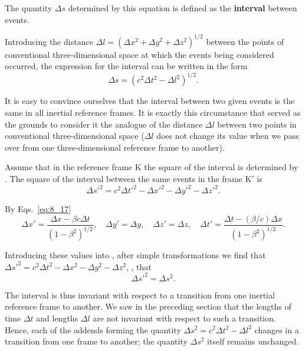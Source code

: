 \noindent
The quantity $\Delta s$ determined by this equation is defined as the \textbf{interval} between events.

Introducing the distance $\Delta l=\left(\Delta x^2+\Delta y^2+\Delta z^2\right)^{1/2}$ between the points of conventional three-dimensional space at which the events being considered occurred, the expression for the interval can be written in the form
\begin{equation}\label{eq:8_23}
	\Delta s = \left(c^2\Delta t^2 - \Delta l^2\right)^{1/2}.
\end{equation}

It is easy to convince ourselves that the interval between two given events is the same in all inertial reference frames. It is exactly this circumstance that served as the grounds to consider it the analogue of the distance $\Delta l$ between two points in conventional three-dimensional space ($\Delta l$ does not change its value when we pass over from one three-dimensional reference frame to another).

Assume that in the reference frame K the square of the interval is determined by . The square of the interval between the same events in the frame K$'$ is
\begin{equation}\label{eq:8_24}
	\Delta s'^2 = c^2\Delta t'^2 - \Delta x'^2 - \Delta y'^2 - \Delta z'^2.
\end{equation}

\noindent
By Eqs.~\eqref{eq:8_17}
\begin{equation*}
	\Delta x' = \frac{\Delta x - \beta c\Delta t}{\left(1 - \beta^2\right)^{1/2}},\quad \Delta y' = \Delta y,\quad \Delta z' = \Delta z,\quad 	\Delta t' = \frac{\Delta t - (\beta/c)\Delta x}{\left(1 - \beta^2\right)^{1/2}}.
\end{equation*}

\noindent
Introducing these values into , after simple transformations we find that $\Delta s'^2 = c^2\Delta t^2 - \Delta x^2 - \Delta y^2 - \Delta z^2$, \ie, that
\begin{equation*}
	\Delta s'^2 = \Delta s^2.
\end{equation*}

The interval is thus invariant with respect to a transition from one inertial reference frame to another. We saw in the preceding section that the lengths of time $\Delta t$ and lengths $\Delta l$ are not invariant with respect to such a transition. Hence, each of the addends forming the quantity $\Delta s^2=c^2\Delta t^2-\Delta l^2$ changes in a transition from one frame to another; the quantity $\Delta s^2$ itself remains unchanged.

